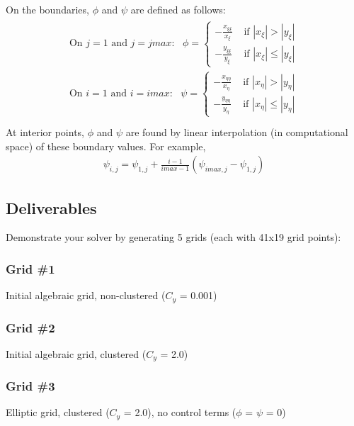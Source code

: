 \documentclass[letterpaper,10pt,english]{sphinxmanual}
\begin{document}
On the boundaries, \(\phi\) and \(\psi\) are defined as follows:
\begin{align*}\!\begin{aligned}
\text{On } j = 1 \text{ and } j = jmax: \text{  }\phi = \begin{cases} -\frac{x_{\xi\xi}}{x_{\xi}} & \text{ if } |x_{\xi}| > |y_{\xi}| \\ -\frac{y_{\xi\xi}}{y_{\xi}} & \text{ if } |x_{\xi}| \leq |y_{\xi}| \end{cases}\\
\text{On } i = 1 \text{ and } i = imax: \text{  }\psi = \begin{cases} -\frac{x_{\eta\eta}}{x_{\eta}} & \text{ if } |x_{\eta}| > |y_{\eta}| \\ -\frac{y_{\eta\eta}}{y_{\eta}} & \text{ if } |x_{\eta}| \leq |y_{\eta}| \end{cases}\\
\end{aligned}\end{align*}
At interior points, \(\phi\) and \(\psi\) are found by linear interpolation (in computational space) of these boundary values. For example,
\begin{equation*}
\begin{split}\psi_{i,j} = \psi_{1,j} + \frac{i-1}{imax-1} \left ( \psi_{imax,j} - \psi_{1,j} \right )\end{split}
\end{equation*}

\subsection{Deliverables}
\label{\detokenize{background:deliverables}}
Demonstrate your solver by generating 5 grids (each with 41x19 grid points):


\subsubsection{Grid \#1}
\label{\detokenize{background:grid-1}}
Initial algebraic grid, non-clustered (\(C_{y}\) = 0.001)


\subsubsection{Grid \#2}
\label{\detokenize{background:grid-2}}
Initial algebraic grid, clustered (\(C_{y}\) = 2.0)


\subsubsection{Grid \#3}
\label{\detokenize{background:grid-3}}
Elliptic grid, clustered (\(C_{y}\) = 2.0), no control terms (\(\phi\) = \(\psi\) = 0)
\end{document}
